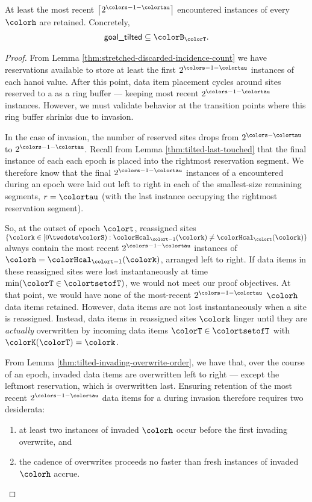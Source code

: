 \begin{lemma}
\label{thm:tilted-most-recent-retained}
At least the most recent $\left\lceil2^{\colors - 1 - \colortau}\right\rceil$ encountered instances of every \hv{} $\colorh$ are retained.
Concretely,
\begin{align*}
\textsf{goal\_tilted} \subseteq \colorB_{\colorT}.
\end{align*}
\end{lemma}
\begin{proof}
From Lemma \ref{thm:stretched-discarded-incidence-count} we have reservations available to store at least the first $2^{\colors - 1 - \colortau}$ instances of each hanoi value.
After this point, data item placement cycles around sites reserved to a \hv as a ring buffer --- keeping most recent $2^{\colors - 1 - \colortau}$ instances.
However, we must validate behavior at the transition points where this ring buffer shrinks due to invasion.

In the case of invasion, the number of reserved sites drops from $2^{\colors - \colortau}$ to $2^{\colors - 1 - \colortau}$.
Recall from Lemma \ref{thm:tilted-last-touched} that the final instance of each \hv{} each epoch is placed into the rightmost reservation segment.
We therefore know that the final $2^{\colors - 1 - \colortau}$ instances of a \hv{} encountered during an epoch were laid out left to right in each of the smallest-size remaining segments, $r = \colortau$ (with the last instance occupying the rightmost reservation segment).

So, at the outset of epoch $\colort$, reassigned sites $\{\colork \in [0\twodots\colorS) : \colorHcal_{\colort - 1}(\colork) \neq \colorHcal_{\colort}(\colork)\}$ always contain the most recent $2^{\colors - 1 - \colortau}$ instances of \hv{} $\colorh = \colorHcal_{\colort - 1}(\colork)$, arranged left to right.
If data items in these reassigned sites were lost instantaneously at time $\min(\colorT \in \colortsetofT)$, we would not meet our proof objectives.
At that point, we would have none of the most-recent $2^{\colors - 1 - \colortau}$ \hv{} $\colorh$ data items retained.
However, data items are not lost instantaneously when a site is reassigned.
Instead, data items in reassigned sites $\colork$ linger until they are \textit{actually} overwritten by incoming data items $\colorT \in \colortsetofT$ with $\colorK(\colorT) = \colork$.

From Lemma \ref{thm:tilted-invading-overwrite-order}, we have that, over the course of an epoch, invaded data items are overwritten left to right --- except the leftmost reservation, which is overwritten last.
Ensuring retention of the most recent $2^{\colors - 1 - \colortau}$ data items for a \hv{} during invasion therefore requires two desiderata:
\begin{enumerate}
\item at least two instances of invaded \hv{} $\colorh$ occur before the first invading overwrite, and
\item the cadence of overwrites proceeds no faster than fresh instances of invaded \hv{} $\colorh$ accrue.
\end{enumerate}



\end{proof}
